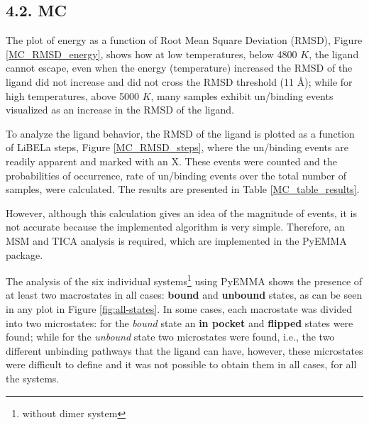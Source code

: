 \documentclass[
  journal=usp, %
  manuscript=final-report,
  year=2023,
  volume=1,
]{cup-journal}
\begin{document}


\subsection{4.2. MC}


% 


The plot of energy as a function of Root Mean Square Deviation (RMSD), Figure \ref{MC_RMSD_energy}, shows how at low temperatures, below 4800 $K$, the ligand cannot escape, even when the energy (temperature) increased the RMSD of the ligand did not increase and did not cross the RMSD threshold (11 \AA); while for high temperatures, above 5000 $K$, many samples exhibit un/binding events visualized as an increase in the RMSD of the ligand. 

To analyze the ligand behavior, the RMSD of the ligand is plotted as a function of LiBELa steps, Figure \ref{MC_RMSD_steps}, where the un/binding events are readily apparent and marked with an X. These events were counted and the probabilities of occurrence, rate of un/binding events over the total number of samples, were calculated. The results are presented in Table \ref{MC_table_results}.

However, although this calculation gives an idea of the magnitude of events, it is not accurate because the implemented algorithm is very simple. Therefore, an MSM and TICA analysis is required, which are implemented in the PyEMMA package. 

The analysis of the six individual systems\footnote{without dimer system} using PyEMMA shows the presence of at least two macrostates in all cases: \textbf{bound} and \textbf{unbound} states, as can be seen in any plot in Figure \ref{fig:all-states}. In some cases, each macrostate was divided into two microstates: for the \textit{bound} state an \textbf{in pocket} and \textbf{flipped} states were found; while for the \textit{unbound} state two microstates were found, i.e., the two different unbinding pathways that the ligand can have, however, these microstates were difficult to define and it was not possible to obtain them in all cases, for all the systems. 
\end{document}
